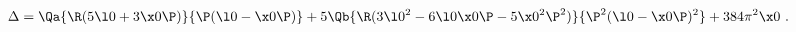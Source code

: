 \begin{equation}
\Delta=\Qa{\R(5\l0+3\x0\P)}{\P(\l0-\x0\P)}
+5\Qb{\R(3\l0^2-6\l0\x0\P-5\x0^2\P^2)}{\P^2(\l0-\x0\P)^2}+384\pi^2\x0\ .
\end{equation}

